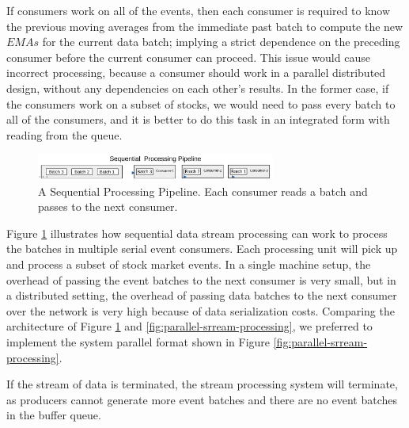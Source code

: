 If consumers work on all of the events, then each consumer is required to know the previous moving averages from the immediate past batch to compute the new $EMAs$ for
the current data batch; implying a strict dependence on the preceding consumer before the current consumer can proceed. This issue would cause incorrect processing, because a 
consumer should work in a parallel distributed design, without any dependencies on each other's results. In the former case, if the consumers work on a subset of stocks, we would 
need to pass every batch to all of the consumers, and it is better to do this task in an integrated form with reading from the queue.



\begin{figure}
    \begin{center}
        \includegraphics[width=0.7\textwidth]{./images/Stream-Batch-Distributions_op2}
        \caption{A Sequential Processing Pipeline. Each consumer reads a batch and passes to the next consumer.}
        \label{fig:Sequential-batch-distributions}
    \end{center}
\end{figure}

Figure \ref{fig:Sequential-batch-distributions} illustrates how sequential data stream processing can work to process the batches in multiple
serial event consumers. Each processing unit will pick up and process a subset of stock market events.
In a single machine setup, the overhead of passing the event batches to the next consumer is very small, but in a distributed setting, the
overhead of passing data batches to the next consumer over the network is very high because of data serialization costs. Comparing the
architecture of Figure \ref{fig:Sequential-batch-distributions} and \ref{fig:parallel-srream-processing}, we preferred to implement the system
parallel format shown in Figure \ref{fig:parallel-srream-processing}.


If the stream of data is terminated, the stream processing system will terminate, as producers cannot generate more event batches
 and there are no event batches in the buffer queue.










